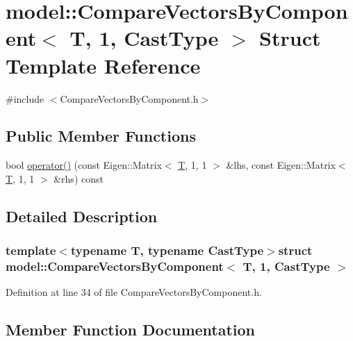 \hypertarget{structmodel_1_1_compare_vectors_by_component_3_01_t_00_011_00_01_cast_type_01_4}{}\section{model\+:\+:Compare\+Vectors\+By\+Component$<$ T, 1, Cast\+Type $>$ Struct Template Reference}
\label{structmodel_1_1_compare_vectors_by_component_3_01_t_00_011_00_01_cast_type_01_4}


{\ttfamily \#include $<$Compare\+Vectors\+By\+Component.\+h$>$}

\subsection*{Public Member Functions}
\begin{DoxyCompactItemize}
\item 
bool \hyperlink{structmodel_1_1_compare_vectors_by_component_3_01_t_00_011_00_01_cast_type_01_4_aeba968558f73d35bd10663f65e7cffbc}{operator()} (const Eigen\+::\+Matrix$<$ \hyperlink{_spline_node_base__corder1_8h_a82692d3a5502b91460591f1d5504314a}{T}, 1, 1 $>$ \&lhs, const Eigen\+::\+Matrix$<$ \hyperlink{_spline_node_base__corder1_8h_a82692d3a5502b91460591f1d5504314a}{T}, 1, 1 $>$ \&rhs) const 
\end{DoxyCompactItemize}


\subsection{Detailed Description}
\subsubsection*{template$<$typename T, typename Cast\+Type$>$struct model\+::\+Compare\+Vectors\+By\+Component$<$ T, 1, Cast\+Type $>$}



Definition at line 34 of file Compare\+Vectors\+By\+Component.\+h.



\subsection{Member Function Documentation}
\hypertarget{structmodel_1_1_compare_vectors_by_component_3_01_t_00_011_00_01_cast_type_01_4_aeba968558f73d35bd10663f65e7cffbc}{}
